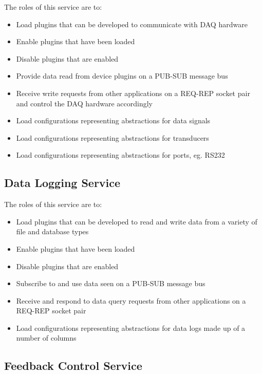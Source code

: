       The roles of this service are to:

      \begin{itemize}
        \item Load plugins that can be developed to communicate with DAQ
          hardware
        \item Enable plugins that have been loaded
        \item Disable plugins that are enabled
        \item Provide data read from device plugins on a PUB-SUB message bus
        \item Receive write requests from other applications on a REQ-REP socket
          pair and control the DAQ hardware accordingly
        \item Load configurations representing abstractions for data signals
        \item Load configurations representing abstractions for transducers
        \item Load configurations representing abstractions for ports, eg. RS232
      \end{itemize}

    \subsection{Data Logging Service}\label{sec:dsg-role-log}

      The roles of this service are to:

      \begin{itemize}
        \item Load plugins that can be developed to read and write data from a
          variety of file and database types
        \item Enable plugins that have been loaded
        \item Disable plugins that are enabled
        \item Subscribe to and use data seen on a PUB-SUB message bus
        \item Receive and respond to data query requests from other applications
          on a REQ-REP socket pair
        \item Load configurations representing abstractions for data logs made
          up of a number of columns
      \end{itemize}

    \subsection{Feedback Control Service}\label{sec:dsg-role-control}

